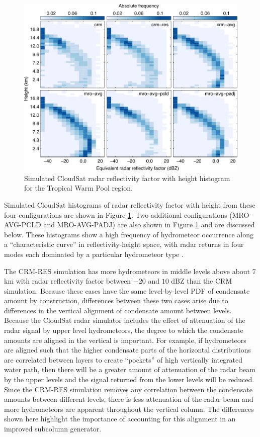 \documentclass[letter]{article}
\begin{document}
\begin{figure}
\centering
\includegraphics{radar_alt40-dbze.pdf}
\caption{Simulated CloudSat radar reflectivity factor with height histogram for the Tropical Warm Pool region.}
\label{cfadDbze94_figure}
\end{figure}


Simulated CloudSat \citep{stephens_et_al_2002} histograms of radar reflectivity factor with height from these four configurations are shown in Figure \ref{cfadDbze94_figure}. Two additional configurations (MRO-AVG-PCLD and MRO-AVG-PADJ) are also shown in Figure \ref{cfadDbze94_figure} and are discussed below. These histograms show a high frequency of hydrometeor occurrence along a ``characteristic curve'' in reflectivity-height space, with radar returns in four modes each dominated by a particular hydrometeor type \citep[described in detail by][]{marchand_et_al_2009}.

The CRM-RES simulation has more hydrometeors in middle levels above about 7 km with radar reflectivity factor between $-20$ and $10$ dBZ than the CRM simulation. Because these cases have the same level-by-level PDF of condensate amount by construction, differences between these two cases arise due to differences in the vertical alignment of condensate amount between levels. Because the CloudSat radar simulator includes the effect of attenuation of the radar signal by upper level hydrometeors, the degree to which the condensate amounts are aligned in the vertical is important. For example, if hydrometeors are aligned such that the higher condensate parts of the horizontal distributions are correlated between layers to create ``pockets'' of high vertically integrated water path, then there will be a greater amount of attenuation of the radar beam by the upper levels and the signal returned from the lower levels will be reduced. Since the CRM-RES simulation removes any correlation between the condensate amounts between different levels, there is less attenuation of the radar beam and more hydrometeors are apparent throughout the vertical column. The differences shown here highlight the importance of accounting for this alignment in an improved subcolumn generator. 
\end{document}
